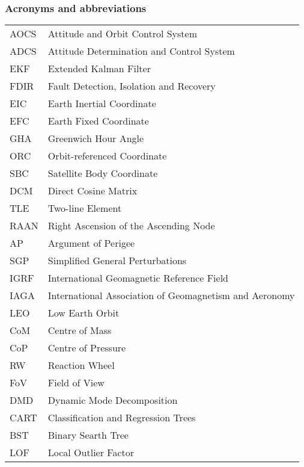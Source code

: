 \newpage
\subsubsection*{Acronyms and abbreviations}

\begingroup
\renewcommand{\arraystretch}{1.2}
\begin{tabular}{@{}p{2.5cm} l}
    AOCS	& Attitude and Orbit Control System \\
    ADCS	& Attitude Determination and Control System \\
    EKF		& Extended Kalman Filter \\
    FDIR	& Fault Detection, Isolation and Recovery \\
    EIC		& Earth Inertial Coordinate \\
    EFC		& Earth Fixed Coordinate \\
    GHA 	& Greenwich Hour Angle \\
    ORC 	& Orbit-referenced Coordinate \\
    SBC 	& Satellite Body Coordinate \\
    DCM 	& Direct Cosine Matrix \\
    TLE 	& Two-line Element \\
    RAAN	& Right Ascension of the Ascending Node \\
    AP		& Argument of Perigee \\
    SGP 	& Simplified General Perturbations \\
    IGRF	& International Geomagnetic Reference Field \\
    IAGA	& International Association of Geomagnetism and Aeronomy \\
    LEO		& Low Earth Orbit \\
    CoM		& Centre of Mass \\
    CoP 	& Centre of Pressure \\
    RW		& Reaction Wheel \\
    FoV		& Field of View \\
    DMD 	& Dynamic Mode Decomposition \\    
    CART	& Classification and Regression Trees \\
    BST		& Binary Searth Tree \\
    LOF		& Local Outlier Factor \\
    
\end{tabular}
\endgroup
